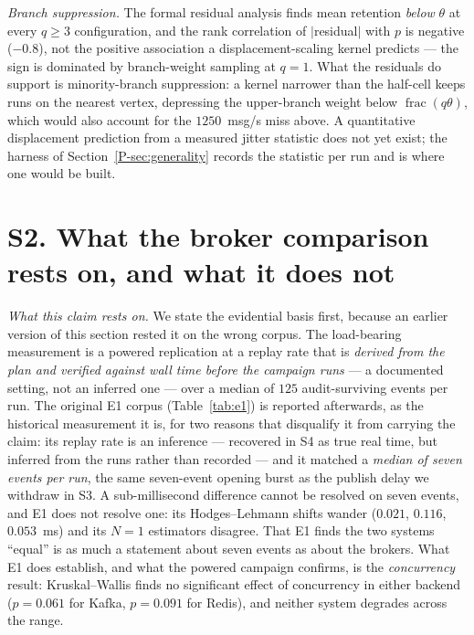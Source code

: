 \documentclass[10pt,journal,onecolumn]{IEEEtran}
\newcommand{\kafka}{Kafka}
\newcommand{\redis}{Redis}
\newcommand{\mainGenerality}{\ref{P-sec:generality}}       %
\begin{document}
\emph{Branch suppression.} The formal residual analysis finds
mean retention \emph{below} $\theta$ at every $q \ge 3$ configuration, and the rank correlation of
$|$residual$|$ with $p$ is negative ($-0.8$), not the positive association a
displacement-scaling kernel predicts --- the sign is dominated by branch-weight sampling at
$q=1$. What the residuals do support is minority-branch suppression: a kernel narrower than the
half-cell keeps runs on the nearest vertex, depressing the upper-branch weight below
$\operatorname{frac}(q\theta)$, which would also account for the $1250$~msg/s miss above.
A quantitative displacement prediction from a measured jitter statistic does not yet exist; the harness of Section~\mainGenerality{} records the statistic per run and is where one would be
built.

\section{S2. What the broker comparison rests on, and what it does not}


\emph{What this claim rests on.} We state the evidential basis first, because an earlier version
of this section rested it on the wrong corpus. The load-bearing measurement is a powered
replication at a replay rate that is \emph{derived from the plan and verified against wall time
before the campaign runs} --- a documented setting, not an inferred one --- over a median of $125$
audit-surviving events per run. The original E1 corpus (Table~\ref{tab:e1}) is reported afterwards, as the
historical measurement it is, for two reasons that disqualify it from carrying the claim: its
replay rate is an inference --- recovered in S4 as true real time,
but inferred from the runs rather than recorded --- and it matched a \emph{median of seven events
per run}, the same seven-event opening burst as the publish delay we withdraw in S3. A sub-millisecond difference cannot be resolved on seven events,
and E1 does not resolve one: its Hodges--Lehmann shifts wander ($0.021$, $0.116$, $0.053$~ms) and
its $N{=}1$ estimators disagree. That E1 finds the two systems ``equal'' is as much a statement
about seven events as about the brokers. What E1 does establish, and what the powered campaign
confirms, is the \emph{concurrency} result: Kruskal--Wallis finds no significant effect of
concurrency in either backend ($p = 0.061$ for \kafka{}, $p = 0.091$ for \redis{}), and neither
system degrades across the range.
\end{document}
